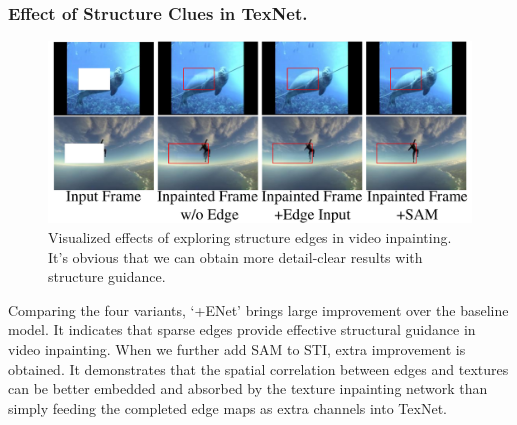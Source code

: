 \subsubsection{Effect of Structure Clues in TexNet.}


\begin{figure}[!ht]
	\centering
	\includegraphics[width=0.97\columnwidth]{edgevis} %
	\caption{Visualized effects of exploring structure edges in video inpainting. It's obvious that we can obtain more detail-clear results with structure guidance.}
	\label{edgevis}
\end{figure}



Comparing the four variants, `+ENet' brings large improvement over the baseline model.
It indicates that sparse edges provide effective structural guidance in video inpainting.
When we further add SAM to STI, extra improvement is obtained. 
It demonstrates that the spatial correlation between  edges and textures can be better embedded and absorbed by the texture inpainting network than simply feeding the completed edge maps as extra channels into TexNet.



